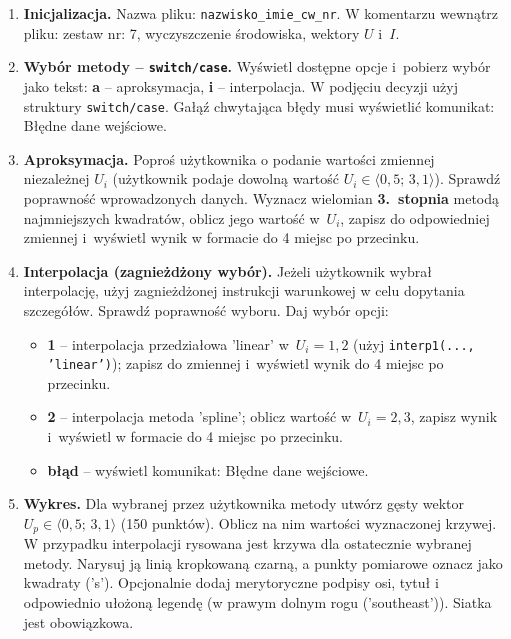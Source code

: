 \documentclass[a4paper,11pt]{article}
\begin{document}
\begin{enumerate}[leftmargin=*, label=\textbf{\arabic*.}, itemsep=2pt]

  \item \textbf{Inicjalizacja.}
    Nazwa pliku: \texttt{nazwisko\_imie\_cw\_nr}. W komentarzu wewnątrz pliku: zestaw nr: 7, wyczyszczenie środowiska, wektory $U$ i~$I$.

  \item \textbf{Wybór metody -- \texttt{switch/case}.}
    Wyświetl dostępne opcje i~pobierz wybór jako tekst: \textbf{a} -- aproksymacja, \textbf{i} -- interpolacja. W podjęciu decyzji użyj struktury \texttt{switch/case}. Gałąź chwytająca błędy musi wyświetlić komunikat: Błędne dane wejściowe.

  \item \textbf{Aproksymacja.}
    Poproś użytkownika o podanie wartości zmiennej niezależnej $U_i$ (użytkownik podaje dowolną wartość $U_i \in \langle 0{,}5;\,3{,}1 \rangle$). Sprawdź poprawność wprowadzonych danych. Wyznacz wielomian \textbf{3.~stopnia} metodą najmniejszych kwadratów, oblicz jego wartość w~$U_i$, zapisz do odpowiedniej zmiennej i~wyświetl wynik w formacie do 4 miejsc po przecinku.

  \item \textbf{Interpolacja (zagnieżdżony wybór).}
    Jeżeli użytkownik wybrał interpolację, użyj zagnieżdżonej instrukcji warunkowej w celu dopytania szczegółów. Sprawdź poprawność wyboru. Daj wybór opcji:
    \begin{itemize}[itemsep=1pt]
      \item \textbf{1} -- interpolacja przedziałowa 'linear' w~$U_i = 1{,}2$ (użyj \texttt{interp1(..., 'linear')}); zapisz do zmiennej i~wyświetl wynik do 4 miejsc po przecinku.
      \item \textbf{2} -- interpolacja metoda 'spline'; oblicz wartość w~$U_i = 2{,}3$, zapisz wynik i~wyświetl w formacie do 4 miejsc po przecinku.
      \item \textbf{błąd} -- wyświetl komunikat: Błędne dane wejściowe.
    \end{itemize}

  \item \textbf{Wykres.}
    Dla wybranej przez użytkownika metody utwórz gęsty wektor $U_p \in \langle 0{,}5;\,3{,}1 \rangle$ (150 punktów). Oblicz na nim wartości wyznaczonej krzywej. W przypadku interpolacji rysowana jest krzywa dla ostatecznie wybranej metody. Narysuj ją linią kropkowaną czarną, a punkty pomiarowe oznacz jako kwadraty ('s'). Opcjonalnie dodaj merytoryczne podpisy osi, tytuł i odpowiednio ułożoną legendę (w prawym dolnym rogu ('southeast')). Siatka jest obowiązkowa.

\end{enumerate}
\end{document}
